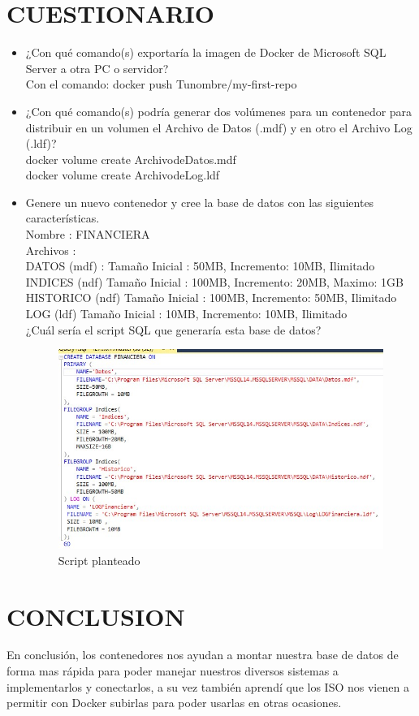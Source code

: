 \documentclass[preprint,12pt]{elsarticle}
\begin{document}
\section{CUESTIONARIO}
\begin{itemize}
	\item ¿Con qué comando(s) exportaría la imagen de Docker de Microsoft SQL Server a otra PC o servidor? \\
	Con el comando: docker push Tunombre/my-first-repo
	\item ¿Con qué comando(s) podría generar dos volúmenes para un contenedor para distribuir en un volumen el Archivo de Datos (.mdf) y en otro el Archivo Log (.ldf)?\\
	docker volume create ArchivodeDatos.mdf \\
	docker volume create ArchivodeLog.ldf
	\item Genere un nuevo contenedor y cree la base de datos con las siguientes características.\\
	Nombre : FINANCIERA\\
	Archivos : \\
	DATOS (mdf) : Tamaño Inicial : 50MB, Incremento: 10MB, Ilimitado \\
	INDICES (ndf) Tamaño Inicial : 100MB, Incremento: 20MB, Maximo: 1GB \\
	HISTORICO (ndf) Tamaño Inicial : 100MB, Incremento: 50MB, Ilimitado \\
	LOG (ldf) Tamaño Inicial : 10MB, Incremento: 10MB, Ilimitado \\
	¿Cuál sería el script SQL que generaría esta base de datos?
	
	\begin{figure}[H]
	\begin{center}
		\includegraphics[width=12cm]{./IMAGENES/foto18} 
		\caption{Script planteado}
	\end{center}
	\end{figure}

\end{itemize}

\section{CONCLUSION}
En conclusión, los contenedores nos ayudan a montar nuestra base de datos de forma mas rápida para poder manejar nuestros diversos sistemas a implementarlos y conectarlos, a su vez también aprendí que los ISO nos vienen a permitir con Docker subirlas para poder usarlas en otras ocasiones.
\end{document}
